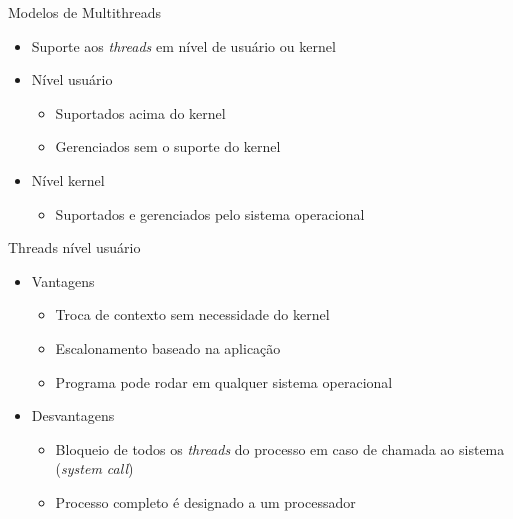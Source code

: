 \documentclass[aspectratio=169,
				xcolor=table]{beamer}
\begin{document}
	\begin{frame}{Modelos de Multithreads}
		\begin{itemize}
			\item Suporte aos \textit{threads} em nível de usuário ou kernel
			\vspace{1em}
			\item Nível usuário
			\begin{itemize}
				\item Suportados acima do kernel 
				\item Gerenciados sem o suporte do kernel
			\end{itemize}
			\vspace{1em}
			\item Nível kernel
			\begin{itemize}
				\item Suportados e  gerenciados pelo sistema operacional
			\end{itemize}
		\end{itemize}
	\end{frame}
	
	\begin{frame}{Threads nível usuário}
		\begin{itemize}
			\item Vantagens
			\begin{itemize}
				\item Troca de contexto sem necessidade do kernel
				\item Escalonamento baseado na aplicação
				\item Programa pode rodar em qualquer sistema operacional
			\end{itemize}
			\vspace{1em}
			\item Desvantagens
			\begin{itemize}
				\item Bloqueio de todos os \textit{threads} do processo em caso de chamada ao sistema (\textit{system call})
				\item Processo completo é designado a um processador
			\end{itemize}
		\end{itemize}
		
	\end{frame}
	
\end{document}
